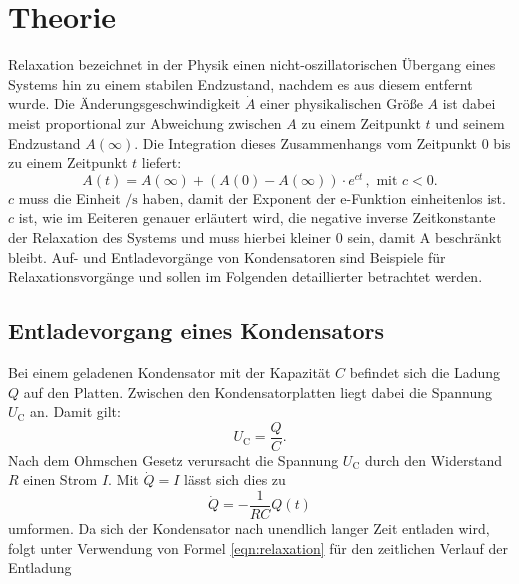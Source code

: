 \section{Theorie}
\label{sec:Theorie}
Relaxation bezeichnet in der Physik einen nicht-oszillatorischen Übergang eines Systems hin zu einem stabilen Endzustand, nachdem es aus diesem entfernt wurde.
Die Änderungsgeschwindigkeit $\dot{A}$ einer physikalischen Größe $A$ ist dabei meist proportional zur Abweichung zwischen $A$ zu einem Zeitpunkt $t$ und seinem Endzustand $A(\infty)$.
Die Integration dieses Zusammenhangs vom Zeitpunkt $0$ bis zu einem Zeitpunkt $t$ liefert:
\begin{equation}
	\label{eqn:relaxation}
	A(t)=A(\infty) + ( A(0)-A(\infty) ) \cdot e^{ct}\, ,\,\, \text{mit}\,\, c<0 .
\end{equation}
$c$ muss die Einheit $\si{\per\second}$ haben, damit der Exponent der e-Funktion einheitenlos ist.
$c$ ist, wie im Eeiteren genauer erläutert wird, die negative inverse Zeitkonstante der Relaxation des Systems und muss hierbei kleiner $0$ sein, damit A beschränkt bleibt.
Auf- und Entladevorgänge von Kondensatoren sind Beispiele für Relaxationsvorgänge und sollen im Folgenden detaillierter betrachtet werden.
\subsection{Entladevorgang eines Kondensators}
Bei einem geladenen Kondensator mit der Kapazität $C$ befindet sich die Ladung $Q$ auf den Platten.
Zwischen den Kondensatorplatten liegt dabei die Spannung $U_\text{C}$ an. Damit gilt:
\begin{equation*}
	U_\text{C}=\frac{Q}{C}.
\end{equation*}
Nach dem Ohmschen Gesetz verursacht die Spannung $U_{\mathrm{C}}$ durch den Widerstand $R$ einen Strom $I$. Mit $\dot{Q}=I$ lässt sich dies zu
\begin{equation}
	\dot{Q}=-\frac{1}{RC}Q(t)
\end{equation}
umformen.
Da sich der Kondensator nach unendlich langer Zeit entladen wird, folgt unter Verwendung von Formel \eqref{eqn:relaxation} für den zeitlichen Verlauf der Entladung

